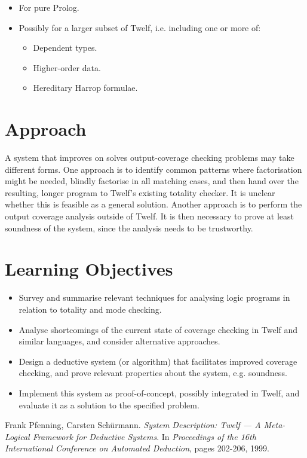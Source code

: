 \documentclass[12pt]{article}
\begin{document}
\begin{itemize}
	\item For pure Prolog.
  \item Possibly for a larger subset of Twelf, i.e. including one or more of:
    \begin{itemize}
      \item Dependent types.
      \item Higher-order data.
      \item Hereditary Harrop formulae.
    \end{itemize}
\end{itemize}

\section*{Approach}


A system that improves on solves output-coverage checking problems may take different forms.
One approach is to identify common patterns where factorisation might be needed, blindly factorise in all matching cases, and then hand over the resulting, longer program to Twelf's existing totality checker.
It is unclear whether this is feasible as a general solution.
Another approach is to perform the output coverage analysis outside of Twelf.
It is then necessary to prove at least soundness of the system, since the analysis needs to be trustworthy.


\section*{Learning Objectives}

\begin{itemize}
	\item Survey and summarise relevant techniques for analysing logic programs in relation to totality and mode checking.
  \item Analyse shortcomings of the current state of coverage checking in Twelf and similar languages, and consider alternative approaches.
  \item Design a deductive system (or algorithm) that facilitates improved coverage checking, and prove relevant properties about the system, e.g. soundness.
  \item Implement this system as proof-of-concept, possibly integrated in Twelf, and evaluate it as a solution to the specified problem.
\end{itemize}

\begin{thebibliography}{9}

Frank Pfenning, Carsten Sch\"{u}rmann.
\textit{System Description: Twelf --- A Meta-Logical Framework for Deductive Systems}.
In \textit{Proceedings of the 16th International Conference on Automated Deduction}, pages 202-206, 1999.

\end{thebibliography}
\end{document}
